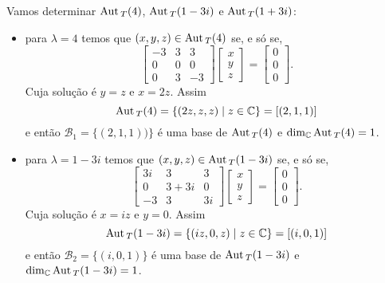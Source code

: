 \begin{exemplo}
\begin{enumerate}[label={\arabic*})]
\begin{solucao}
                Vamos determinar ${\rm Aut\,}_T(4)$, ${\rm Aut\,}_T(1 - 3i)$ e ${\rm Aut\,}_T(1 + 3i)$:
                \begin{itemize}
                    \item para $\lambda = 4$ temos que $(x,y,z) \in {\rm Aut\,}_T(4)$ se, e s\'o se,
                    \[
                        \begin{bmatrix}-3 & 3 & 3\\0 & 0 & 0\\0 & 3 & -3\end{bmatrix}
                        \begin{bmatrix}x\\y\\z\end{bmatrix} = \begin{bmatrix}0\\0\\0\end{bmatrix}.
                    \]
                    Cuja solu\c{c}ão é $y = z$ e $x = 2z$. Assim
                    \[
                        {\rm Aut\,}_T(4) = \{(2z,z,z) \mid z \in \mathbb{C}\} = [(2,1,1)]
                    \]
                e ent\~ao $\mathcal{B}_1 = \{(2,1,1))\}$ \'e uma base de ${\rm Aut\,}_T(4)$ e $\dim_{\mathbb{C}}{\rm Aut\,}_T(4) = 1$.

                \item para $\lambda = 1 - 3i$ temos que $(x,y,z) \in {\rm Aut\,}_T(1 - 3i)$ se, e s\'o se,
                \[
                    \begin{bmatrix}
                        3i & 3 & 3\\
                        0 & 3 + 3i & 0\\
                        -3 & 3 & 3i
                    \end{bmatrix}\begin{bmatrix}
                        x\\y\\z
                    \end{bmatrix} = \begin{bmatrix}
                        0\\0\\0
                    \end{bmatrix}.
                \]
                Cuja solu\c{c}ão é $x = iz$ e $y = 0$. Assim
                \[
                    {\rm Aut\,}_T(1 - 3i) = \{(iz,0,z) \mid z \in \mathbb{C}\} = [(i,0,1)]
                \]
                e ent\~ao $\mathcal{B}_2 = \{(i,0,1)\}$ \'e uma base de ${\rm Aut\,}_T(1 - 3i)$ e $\dim_{\mathbb{C}}{\rm Aut\,}_T(1 - 3i) = 1$.


\end{itemize}
\end{solucao}
\end{enumerate}
\end{exemplo}
